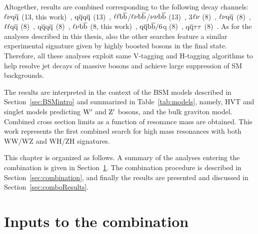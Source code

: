 Altogether, results are combined corresponding to the following decay channels: $\ell \nu \mathrm{q}\overline{\mathrm{q}}$ (13\TeV, this work)~\cite{CMS-PAS-EXO-15-002}, $\mathrm{q}\overline{\mathrm{q}} \mathrm{q}\overline{\mathrm{q}}$ (13\TeV)~\cite{CMS-PAS-EXO-15-002},
$\ell \ell {\mathrm{b}\overline{\mathrm{b}}}$/$\ell \nu {\mathrm{b}\overline{\mathrm{b}}}$/$\nu \nu {\mathrm{b}\overline{\mathrm{b}}}$ (13\TeV)~\cite{Khachatryan:2016cfx},
3$\ell\nu$ (8\TeV)~\cite{Khachatryan:2014xja}, 
$\ell \nu \mathrm{q}\overline{\mathrm{q}}$ (8\TeV)~\cite{Khachatryan:2014gha}, $\ell\ell \mathrm{q}\overline{\mathrm{q}}$ (8\TeV)~\cite{Khachatryan:2014gha}, 
$\mathrm{q}\overline{\mathrm{q}} \mathrm{q}\overline{\mathrm{q}}$ (8\TeV)~\cite{Khachatryan:2014hpa}, 
$\ell \nu {\mathrm{b}\overline{\mathrm{b}}}$ (8\TeV, this work)~\cite{Khachatryan:2016yji}, $\mathrm{q}\overline{\mathrm{q}}{\mathrm{b}\overline{\mathrm{b}}}/6$q (8\TeV)~\cite{Khachatryan:2015bma}, 
$\mathrm{q}\overline{\mathrm{q}} \tau\tau $ (8\TeV)~\cite{Khachatryan:2015ywa}.
As for the analyses described in this thesis, also the other searches feature a similar experimental signature given by highly boosted bosons in the final state.
Therefore, all these analyses exploit same V-tagging and H-tagging algorithms to help resolve jet decays of massive bosons and achieve large suppression of SM backgrounds.

The results are interpreted in the context of the BSM models described in Section~\ref{sec:BSMintro} and summarized in Table~\ref{tab:models}, namely, HVT and singlet models predicting $\mathrm{W}^\prime$ and $\mathrm{Z}^\prime$ bosons, and the bulk graviton model.
Combined cross section limits as a function of resonance mass are obtained. This work represents the first combined search for high mass resonances with both WW/WZ and WH/ZH signatures.

This chapter is organized as follows.
A summary of the analyses entering the combination is given in Section~\ref{sec:analyses}.
The combination procedure is described in Section~\ref{sec:combination}, and finally the results are presented and discussed in Section~\ref{sec:comboResults}.

\section{Inputs to the combination}\label{sec:analyses}


